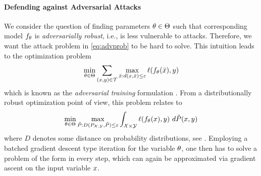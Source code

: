 \paragraph{Defending against Adversarial Attacks}
%
%
We consider the question of finding parameters $\theta\in\Theta$ such that corresponding model $f_\theta$ is \emph{adversarially robust}, i.e., is less vulnerable to attacks. Therefore, we want the attack problem in \cref{eq:advprob} to be hard to solve. This intuition leads to the optimization problem
%
\begin{align*}
\min_{\theta\in\Theta} \sum_{(x,y)\in \mathcal{T}} \max_{\bar{x}:d(x,\bar{x})\leq\varepsilon} \ell(f_\theta(\bar{x}), y)
\end{align*}
%
which is known as the \emph{adversarial training} formulation \cite{kurakin2016adversarial2, madry2017towards}. From a distributionally robust optimization point of view, this problem relates to 
%
\begin{align*}
\min_{\param\in\Param} \max_{\tilde P: D(P_{\Inp,\Oup}, \tilde P)\leq\budget} \int_{\Inp\times\Oup} \ell(\net_\param(\inp), \oup)\ d\tilde{P}(\inp,\oup)
\end{align*}
%
where $D$ denotes some distance on probability distributions, see \cite{bungert2023geometry}. Employing a batched gradient descent type iteration for the variable $\theta$, one then has to solve a problem of the form  in every step, which can again be approximated via gradient ascent on the input variable $x$.
%
%
%
